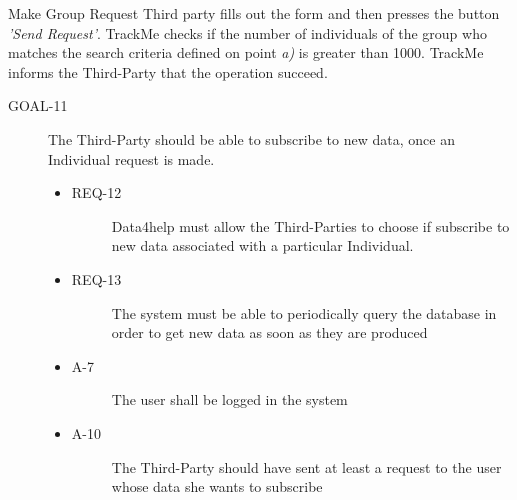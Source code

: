 \documentclass[a4paper]{article}
\newcommand{\requirement}{\ding{229}}%
\begin{document}
        \begin{usecase}{Make Group Request}
        {Third party fills out the form and then presses the button \textit{'Send Request'}.}
        {TrackMe checks if the number of individuals of the group who matches the search criteria defined on point \textit{a)} is greater than 1000.}
        {TrackMe informs the Third-Party that the operation succeed.}
        \end{usecase}
        
                \begin{description}
        	\item[GOAL-11] The Third-Party should be able to subscribe to new data, once an Individual request is made. 
            	\begin{itemize}
            	    \item[\requirement]
                	\begin{description}
                	\item[REQ-12] Data4help must allow the Third-Parties to choose if subscribe to new data associated with a particular Individual. 
                	\end{description}
                	\item[\requirement]
                	\begin{description}
                	\item[REQ-13]The system must be able to periodically query the database in order to get new data as soon as they are produced
                	\end{description}
                	\item
                	\begin{description}
                	\item[A-7] The user shall be logged in the system
                	\end{description}
                	\item
                	\begin{description}
                	\item[A-10] The Third-Party should have sent at least a request to the user whose data she wants to subscribe
                	\end{description}
                	\end{itemize}
        \end{description}
        
\end{document}
